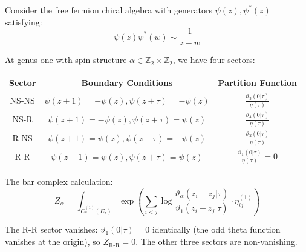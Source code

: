 \begin{example}
Consider the free fermion chiral algebra with generators $\psi(z), \psi^*(z)$ satisfying:
\[\psi(z)\psi^*(w) \sim \frac{1}{z-w}\]

At genus one with spin structure $\alpha \in \mathbb{Z}_2 \times \mathbb{Z}_2$, we have four sectors:

\begin{center}
\begin{tabular}{|c|c|c|}
\hline
Sector & Boundary Conditions & Partition Function \\
\hline
NS-NS & $\psi(z+1) = -\psi(z), \psi(z+\tau) = -\psi(z)$ & $\frac{\vartheta_3(0|\tau)}{\eta(\tau)}$ \\
NS-R & $\psi(z+1) = -\psi(z), \psi(z+\tau) = \psi(z)$ & $\frac{\vartheta_4(0|\tau)}{\eta(\tau)}$ \\
R-NS & $\psi(z+1) = \psi(z), \psi(z+\tau) = -\psi(z)$ & $\frac{\vartheta_2(0|\tau)}{\eta(\tau)}$ \\
R-R & $\psi(z+1) = \psi(z), \psi(z+\tau) = \psi(z)$ & $\frac{\vartheta_1(0|\tau)}{\eta(\tau)} = 0$ \\
\hline
\end{tabular}
\end{center}

The bar complex calculation:
\[Z_\alpha = \int_{\overline{C}_*^{(1)}(E_\tau)} \exp\left(\sum_{i<j} \log\frac{\vartheta_\alpha(z_i - z_j|\tau)}{\vartheta_1(z_i - z_j|\tau)} \cdot \eta_{ij}^{(1)}\right)\]

The R-R sector vanishes: $\vartheta_1(0|\tau) = 0$ identically (the odd theta function vanishes at the origin), so $Z_{\mathrm{R\text{-}R}} = 0$. The other three sectors are non-vanishing.
\end{example}

